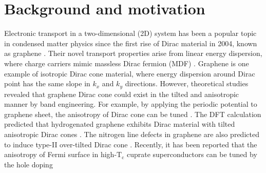 \section{Background and motivation}
    Electronic transport in a two-dimensional (2D) system has been a popular topic in condensed matter physics since the first rise of Dirac material in 2004, known as graphene \cite{Zhang2004,Wehling2014}. 
    Their novel transport properties arise from linear energy dispersion, where charge carriers mimic massless Dirac fermion (MDF) \cite{CastroNeto2009}. 
    Graphene is one example of isotropic Dirac cone material, where energy dispersion around Dirac point has the same slope in $k_x$ and $k_y$ directions. 
    However, theoretical studies revealed that graphene Dirac cone could exist in the tilted and anisotropic manner by band engineering. 
    For example, by applying the periodic potential to graphene sheet, the anisotropy of Dirac cone can be tuned \cite{Park2008}. 
    The DFT calculation predicted that hydrogenated graphene exhibits Dirac material with tilted anisotropic Dirac cones \cite{Lu2016}. 
    The nitrogen line defects in graphene are also predicted to induce type-II over-tilted Dirac cone \cite{Zhang2017a}.
    Recently, it has been reported that the anisotropy of Fermi surface in high-$\mathrm{T_c}$ cuprate superconductors can be tuned by the hole doping \cite{Marino2019}\\

